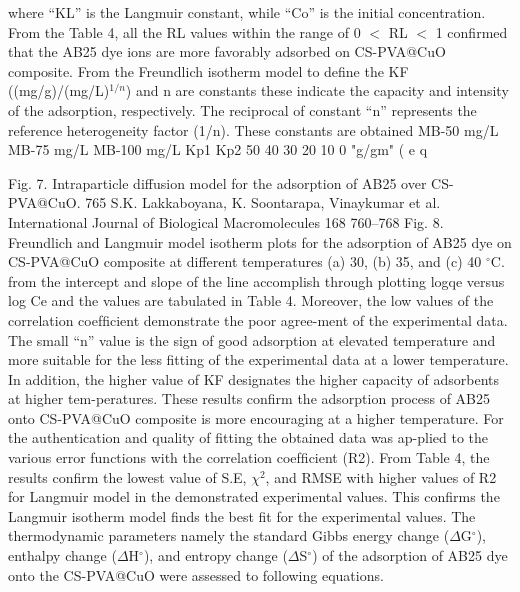 \documentclass[final,5p,times,twocolumn,authoryear]{elsarticle}
\begin{document}
where ``KL'' is the Langmuir constant, while ``Co'' is the initial concentration.
From the Table 4, all the RL values within the range of 0 $<$ RL $<$ 1 confirmed that the AB25 dye ions are more favorably adsorbed on CS-PVA@CuO composite.
From the Freundlich isotherm model to define the KF ((mg/g)/(mg/L)$^{1/n}$) and n are constants these indicate the capacity and intensity of the adsorption, respectively. The reciprocal of constant ``n'' represents the reference heterogeneity factor (1/n). These constants are obtained
MB-50 mg/L
MB-75 mg/L
MB-100 mg/L
Kp1
Kp2
50
40
30
20
10
0
"g/gm"
(
e
q

Fig. 7. Intraparticle diffusion model for the adsorption of AB25 over CS-PVA@CuO.
765
S.K. Lakkaboyana, K. Soontarapa, Vinaykumar et al.
International Journal of Biological Macromolecules 168 760–768
Fig. 8. Freundlich and Langmuir model isotherm plots for the adsorption of AB25 dye on CS-PVA@CuO composite at different temperatures (a) 30, (b) 35, and (c) 40 $^\circ$C.
from the intercept and slope of the line accomplish through plotting logqe versus log Ce and the values are tabulated in Table 4. Moreover, the low values of the correlation coefﬁcient demonstrate the poor agree-ment of the experimental data. The small “n” value is the sign of good adsorption at elevated temperature and more suitable for the less ﬁtting of the experimental data at a lower temperature. In addition, the higher value of KF designates the higher capacity of adsorbents at higher tem-peratures. These results conﬁrm the adsorption process of AB25 onto CS-PVA@CuO composite is more encouraging at a higher temperature. For the authentication and quality of ﬁtting the obtained data was ap-plied to the various error functions with the correlation coefﬁcient (R2). From Table 4, the results conﬁrm the lowest value of S.E, $\chi^{2}$, and RMSE with higher values of R2 for Langmuir model in the demonstrated experimental values. This conﬁrms the Langmuir isotherm model finds the best ﬁt for the experimental values.
The thermodynamic parameters namely the standard Gibbs energy change ($\Delta$G$^\circ$), enthalpy change ($\Delta$H$^\circ$), and entropy change ($\Delta$S$^\circ$) of the adsorption of AB25 dye onto the CS-PVA@CuO were assessed to following equations.
\end{document}
